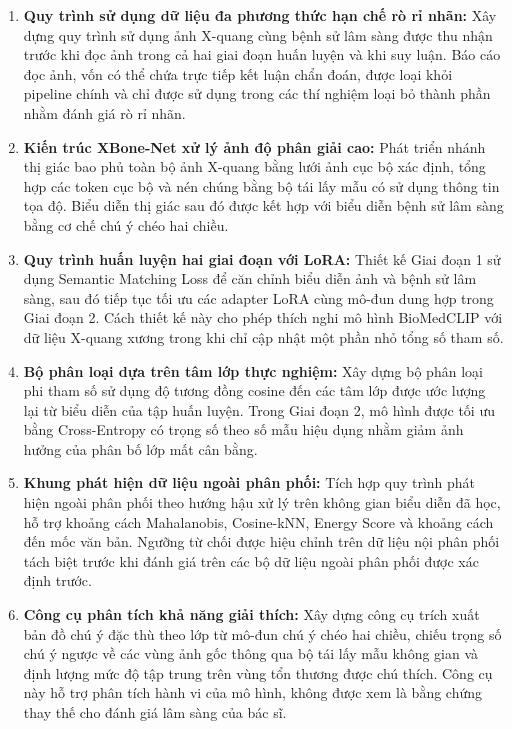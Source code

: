 \begin{enumerate}
    \item \textbf{Quy trình sử dụng dữ liệu đa phương thức hạn chế rò rỉ nhãn:} Xây dựng quy trình sử dụng ảnh X-quang cùng bệnh sử lâm sàng được thu nhận trước khi đọc ảnh trong cả hai giai đoạn huấn luyện và khi suy luận. Báo cáo đọc ảnh, vốn có thể chứa trực tiếp kết luận chẩn đoán, được loại khỏi pipeline chính và chỉ được sử dụng trong các thí nghiệm loại bỏ thành phần nhằm đánh giá rò rỉ nhãn.

    \item \textbf{Kiến trúc XBone-Net xử lý ảnh độ phân giải cao:} Phát triển nhánh thị giác bao phủ toàn bộ ảnh X-quang bằng lưới ảnh cục bộ xác định, tổng hợp các token cục bộ và nén chúng bằng bộ tái lấy mẫu có sử dụng thông tin tọa độ. Biểu diễn thị giác sau đó được kết hợp với biểu diễn bệnh sử lâm sàng bằng cơ chế chú ý chéo hai chiều.

    \item \textbf{Quy trình huấn luyện hai giai đoạn với LoRA:} Thiết kế Giai đoạn 1 sử dụng Semantic Matching Loss để căn chỉnh biểu diễn ảnh và bệnh sử lâm sàng, sau đó tiếp tục tối ưu các adapter LoRA cùng mô-đun dung hợp trong Giai đoạn 2. Cách thiết kế này cho phép thích nghi mô hình BioMedCLIP với dữ liệu X-quang xương trong khi chỉ cập nhật một phần nhỏ tổng số tham số.

    \item \textbf{Bộ phân loại dựa trên tâm lớp thực nghiệm:} Xây dựng bộ phân loại phi tham số sử dụng độ tương đồng cosine đến các tâm lớp được ước lượng lại từ biểu diễn của tập huấn luyện. Trong Giai đoạn 2, mô hình được tối ưu bằng Cross-Entropy có trọng số theo số mẫu hiệu dụng nhằm giảm ảnh hưởng của phân bố lớp mất cân bằng.

    \item \textbf{Khung phát hiện dữ liệu ngoài phân phối:} Tích hợp quy trình phát hiện ngoài phân phối theo hướng hậu xử lý trên không gian biểu diễn đã học, hỗ trợ khoảng cách Mahalanobis, Cosine-kNN, Energy Score và khoảng cách đến mốc văn bản. Ngưỡng từ chối được hiệu chỉnh trên dữ liệu nội phân phối tách biệt trước khi đánh giá trên các bộ dữ liệu ngoài phân phối được xác định trước.

    \item \textbf{Công cụ phân tích khả năng giải thích:} Xây dựng công cụ trích xuất bản đồ chú ý đặc thù theo lớp từ mô-đun chú ý chéo hai chiều, chiếu trọng số chú ý ngược về các vùng ảnh gốc thông qua bộ tái lấy mẫu không gian và định lượng mức độ tập trung trên vùng tổn thương được chú thích. Công cụ này hỗ trợ phân tích hành vi của mô hình, không được xem là bằng chứng thay thế cho đánh giá lâm sàng của bác sĩ.
\end{enumerate}

